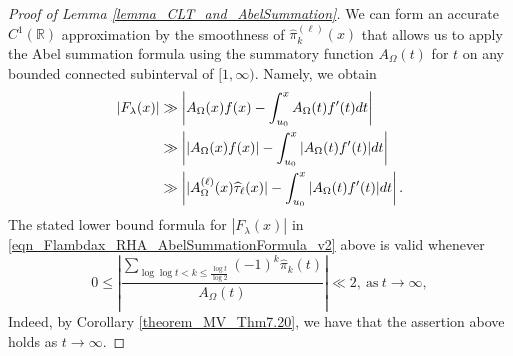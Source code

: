 \documentclass[11pt,reqno,a4letter]{article}
\numberwithin{figure}{section}
\numberwithin{table}{section}
\theoremstyle{plain}
\numberwithin{theorem}{section}
\theoremstyle{definition}
\begin{document}
\begin{proof}[Proof of Lemma \ref{lemma_CLT_and_AbelSummation}] 
We can form an accurate $C^{1}(\mathbb{R})$ approximation by the smoothness of 
$\widehat{\pi}_k^{(\ell)}(x)$ that allows us to apply the Abel summation formula using the summatory 
function $A_{\Omega}(t)$ for $t$ on any bounded connected subinterval of $[1, \infty)$. 
Namely, we obtain 
\begin{align} 
\notag 
|F_{\lambda}(x)| & \gg 
     \left\lvert A_{\Omega}(x) f(x) - \int_{u_0}^{x} 
     A_{\Omega}(t) f^{\prime}(t) dt \right\rvert \\ 
\label{eqn_Flambdax_RHA_AbelSummationFormula_v2} 
     & \gg 
     \left\lvert |A_{\Omega}(x) f(x)| - \int_{u_0}^{x} 
     |A_{\Omega}(t) f^{\prime}(t)| dt \right\rvert \\ 
\notag 
     & \gg 
     \left\lvert |A_{\Omega}^{(\ell)}(x) \widehat{\tau}_{\ell}(x)| - \int_{u_0}^{x} 
     |A_{\Omega}(t) f^{\prime}(t)| dt \right\rvert. 
\end{align} 
The stated lower bound formula for $|F_{\lambda}(x)|$ in 
\eqref{eqn_Flambdax_RHA_AbelSummationFormula_v2} 
above is valid  whenever 
\[
0 \leq \left\lvert \frac{\displaystyle\sum\limits_{\log\log t < k \leq \frac{\log t}{\log 2}} 
     (-1)^k \widehat{\pi}_k(t)}{A_{\Omega}(t)}\right\rvert \ll 2, 
     \mathrm{\ as\ } t \rightarrow \infty, 
\]
Indeed, by Corollary \ref{theorem_MV_Thm7.20}, we have that 
the assertion above holds as $t \rightarrow \infty$.  


\end{proof}
\end{document}
